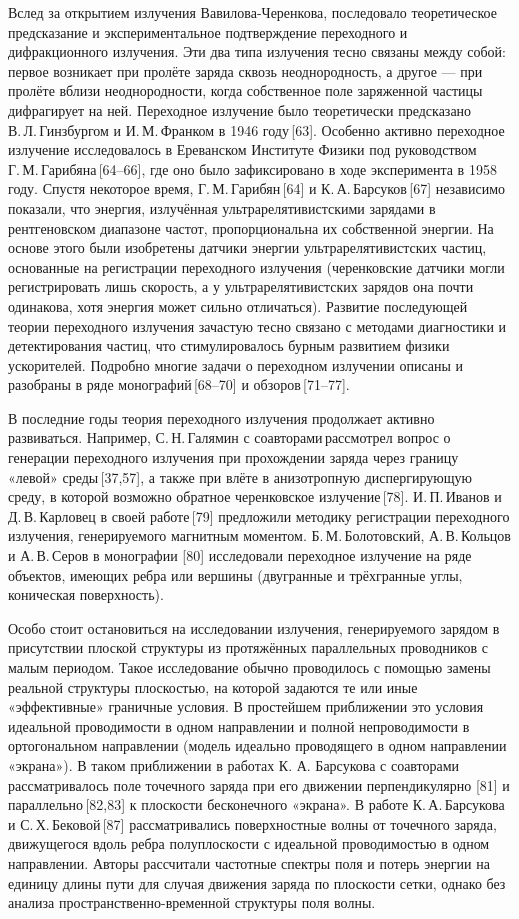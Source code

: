 Вслед за открытием излучения Вавилова-Черенкова, последовало теоретическое предсказание и экспериментальное подтверждение переходного и дифракционного излучения. Эти два типа излучения тесно связаны между собой: первое возникает при пролёте заряда сквозь неоднородность, а другое — при пролёте вблизи неоднородности, когда собственное поле заряженной частицы дифрагирует на ней. Переходное излучение было теоретически предсказано В. Л. Гинзбургом и И. М. Франком в 1946 году [63]. Особенно активно переходное излучение исследовалось в Ереванском Институте Физики под руководством Г. М. Гарибяна [64–66], где оно было зафиксировано в ходе эксперимента в 1958 году. Спустя некоторое время, Г. М. Гарибян [64] и К. А. Барсуков [67] независимо показали, что энергия, излучённая ультрарелятивистскими зарядами в рентгеновском диапазоне частот, пропорциональна их собственной энергии. На основе этого были изобретены датчики энергии ультрарелятивистских частиц, основанные на регистрации переходного излучения (черенковские датчики могли регистрировать лишь скорость, а у ультрарелятивистских зарядов она почти одинакова, хотя энергия может сильно отличаться). Развитие последующей теории переходного излучения зачастую тесно связано с методами диагностики и детектирования частиц, что стимулировалось бурным развитием физики ускорителей. Подробно многие задачи о переходном излучении описаны и разобраны в ряде монографий [68–70] и обзоров [71–77].

В последние годы теория переходного излучения продолжает активно развиваться. Например, С. Н. Галямин с соавторами рассмотрел вопрос о генерации переходного излучения при прохождении заряда через границу «левой» среды [37,57], а также при влёте в анизотропную диспергирующую среду, в которой возможно обратное черенковское излучение [78]. И. П. Иванов и Д. В. Карловец в своей работе [79] предложили методику регистрации переходного излучения, генерируемого магнитным моментом. Б. М. Болотовский, А. В. Кольцов и А. В. Серов в монографии [80] исследовали переходное излучение на ряде объектов, имеющих ребра или вершины (двугранные и трёхгранные углы, коническая поверхность).

Особо стоит остановиться на исследовании излучения, генерируемого зарядом в присутствии плоской структуры из протяжённых параллельных проводников с малым периодом. Такое исследование обычно проводилось с помощью замены реальной структуры плоскостью, на которой задаются те или иные «эффективные» граничные условия. В простейшем приближении это условия идеальной проводимости в одном направлении и полной непроводимости в ортогональном направлении (модель идеально проводящего в одном направлении «экрана»). В таком приближении в работах К. А. Барсукова с соавторами рассматривалось поле точечного заряда при его движении перпендикулярно [81] и параллельно [82,83] к плоскости бесконечного «экрана». В работе К. А. Барсукова и С. Х. Бековой [87] рассматривались поверхностные волны от точечного заряда, движущегося вдоль ребра полуплоскости с идеальной проводимостью в одном направлении. Авторы рассчитали частотные спектры поля и потерь энергии на единицу длины пути для случая движения заряда по плоскости сетки, однако без анализа пространственно-временной структуры поля волны.

